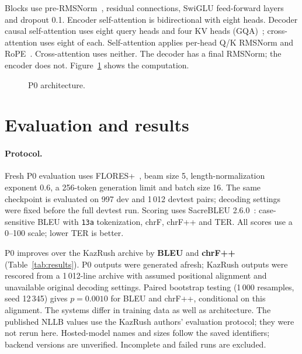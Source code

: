 \documentclass{article}
\begin{document}
Blocks use pre-RMSNorm~\cite{rmsnorm}, residual connections, SwiGLU
feed-forward layers~\cite{swiglu} and dropout 0.1.
Encoder self-attention is bidirectional with eight heads. Decoder causal
self-attention uses eight query heads and four KV heads
(GQA)~\cite{gqa}; cross-attention uses eight of each.
Self-attention applies per-head Q/K RMSNorm and RoPE~\cite{rope}.
Cross-attention uses neither. The decoder has a final RMSNorm; the encoder
does not. Figure~\ref{fig:architecture} shows the computation.

\begin{figure}[!ht]\centering
\resizebox{\linewidth}{!}{}
\caption{P0 architecture.}
\label{fig:architecture}
\end{figure}

\section{Evaluation and results}
\paragraph{Protocol.}
Fresh P0 evaluation uses FLORES+~\cite{floresplus}, beam size 5,
length-normalization exponent 0.6, a 256-token generation limit and batch
size 16. The same checkpoint is evaluated on 997 dev and 1\,012 devtest
pairs; decoding settings were fixed before the full devtest run.
Scoring uses SacreBLEU 2.6.0~\cite{sacrebleu}: case-sensitive BLEU with
\texttt{13a} tokenization, chrF, chrF++ and TER. All scores use a 0--100
scale; lower TER is better.

\begin{table}[!ht]\centering\small
\setlength{\tabcolsep}{3pt}
\caption{FLORES+ devtest, ordered by BLEU. $\dagger$: row or value
published in the KazRush model card~\cite{kazrush}; other scores use common
rescoring of 1\,012 translations. COMET uses a 0--100 scale;
dashes indicate unavailable measurements.}

\label{tab:results}
\end{table}

P0 improves over the KazRush archive by \textbf{\DeltaBLEU{} BLEU} and
\textbf{\DeltaChrFPP{} chrF++} (Table~\ref{tab:results}).
P0 outputs were generated afresh; KazRush outputs were rescored from a
1\,012-line archive with assumed positional alignment and unavailable
original decoding settings. Paired bootstrap testing (1\,000 resamples,
seed 12\,345) gives $p=0.0010$ for BLEU and chrF++, conditional on this
alignment. The systems differ in training data as well as architecture.
The published NLLB values use the KazRush authors' evaluation protocol;
they were not rerun here. Hosted-model names and sizes follow the saved
identifiers; backend versions are unverified. Incomplete and failed runs
are excluded.
\end{document}
